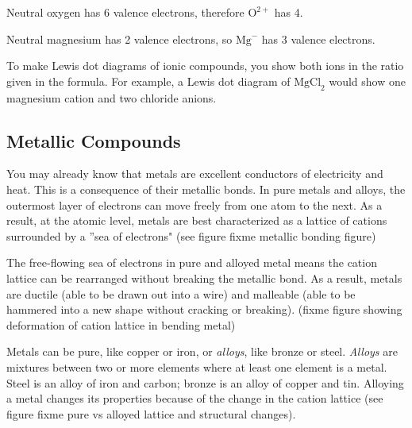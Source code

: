 Neutral oxygen has 6 valence electrons, therefore $\text{O}^{2+}$ has 4. 
\begin{center}
\end{center}

Neutral magnesium has 2 valence electrons, so $\text{Mg}^{-}$ has 3 valence 
electrons. 
\begin{center}
\end{center}

To make Lewis dot diagrams of ionic compounds, you show both ions in the ratio 
given in the formula. For example, a Lewis dot diagram of $\text{MgCl}_2$ would 
show one magnesium cation and two chloride anions. 

\subsection{Metallic Compounds}
You may already know that metals are excellent conductors 
of electricity and heat. This is a consequence of their metallic bonds. In pure 
metals and alloys, the outermost layer of electrons can move freely from one atom 
to the next. As a result, at the atomic level, metals are best characterized as a 
lattice of cations surrounded by a ''sea of electrons" (see figure	fixme metallic bonding figure)

The free-flowing sea of electrons in pure and alloyed metal means the cation 
lattice can be rearranged without breaking the metallic bond. As a result, metals 
are ductile (able to be drawn out into a wire) and malleable (able to be hammered 
into a new shape without cracking or breaking). (fixme figure showing deformation of cation lattice in bending metal)

Metals can be pure, like copper or iron, or \textit{alloys}, like bronze or steel. 
\textit{Alloys} are mixtures between two or more elements where at least one 
element is a metal. Steel is an alloy of iron and carbon; bronze is 
an alloy of copper and tin. Alloying a metal changes its properties because of 
the change in the cation lattice (see figure fixme pure vs alloyed lattice and 
structural changes). 

